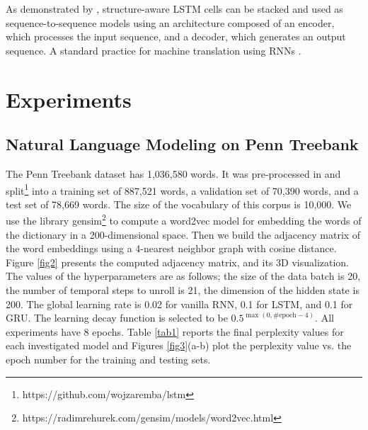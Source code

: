\documentclass{article} %
\begin{document}
As demonstrated by \citet{convlstm}, structure-aware LSTM cells can be stacked
and used as sequence-to-sequence models using an architecture composed of an
encoder, which processes the input sequence, and a decoder, which generates an
output sequence. A standard practice for machine translation using RNNs
\citep{gru, seq2seq}.




\section{Experiments}
\label{experiments}




\subsection{Natural Language Modeling on Penn Treebank}

The Penn Treebank dataset has 1,036,580 words. It was pre-processed in \cite{zaremba2014recurrent} and split\footnote{https://github.com/wojzaremba/lstm} into a training set of 887,521 words, a validation set of 70,390 words, and a test set of 78,669 words. The size of the vocabulary of this corpus is 10,000. We use the library gensim\footnote{https://radimrehurek.com/gensim/models/word2vec.html} to compute a word2vec model \cite{word2vec} for embedding the words of the dictionary in a 200-dimensional space. Then we build the adjacency matrix of the word embeddings using a 4-nearest neighbor graph with cosine distance. Figure \ref{fig2} presents the computed adjacency matrix, and its 3D visualization. The values of the hyperparameters are as follows; the size of the data batch is 20, the number of temporal steps to unroll is 21, the dimension of the hidden state is 200. The global learning rate is 0.02 for vanilla RNN, 0.1 for LSTM, and 0.1 for GRU. The learning decay function is selected to be $0.5^{\max(0,\textrm{\#epoch}-4)}$. All experiments have 8 epochs. Table \ref{tab1} reports the final perplexity values for each investigated model and Figures \ref{fig3}(a-b) plot the perplexity value vs. the epoch number for the training and testing sets. 
\end{document}
